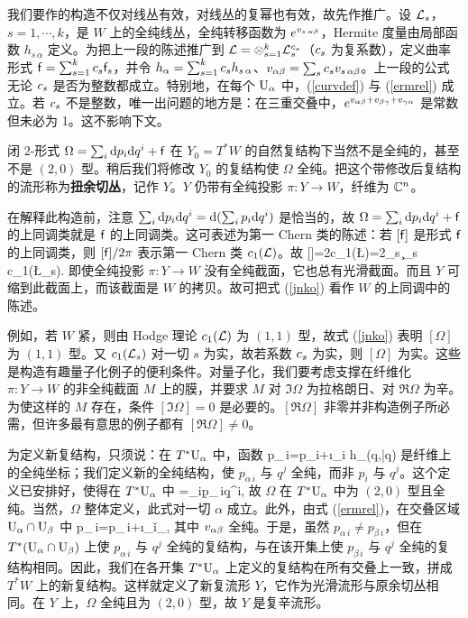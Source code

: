 我们要作的构造不仅对线丛有效，对线丛的复幂也有效，故先作推广。设 ${\mathcal L}_s$，$s=1,\cdots,k$，是 $W$ 上的全纯线丛，全纯转移函数为 $e^{v_{s\,\alpha\beta}}$，Hermite 度量由局部函数 $h_{s\,\alpha}$ 定义。为把上一段的陈述推广到 ${\mathcal L}=\otimes_{s=1}^k{\mathcal L}_s^{c_s}$（$c_s$ 为复系数），定义曲率形式 ${\sf f}=\sum_{s=1}^kc_s{\sf f}_s$，并令 $h_\alpha=\sum_{s=1}^kc_s h_{s\,\alpha}$、$v_{\alpha\beta}=\sum_sc_sv_{s\,\alpha\beta}$。上一段的公式无论 $c_s$ 是否为整数都成立。特别地，在每个 ${\mathrm U}_\alpha$ 中，(\ref{curvdef}) 与 (\ref{ermrel}) 成立。若 $c_s$ 不是整数，唯一出问题的地方是：在三重交叠中，$e^{v_{\alpha\beta}+v_{\beta\gamma}+v_{\gamma\alpha}}$ 是常数但未必为 1。这不影响下文。

闭 2-形式 $\Omega=\sum_i{\mathrm d} p_i{\mathrm d} q^i+{\sf f}$ 在 $Y_0=T^*W$ 的自然复结构下当然不是全纯的，甚至不是 $(2,0)$ 型。稍后我们将修改 $Y_0$ 的复结构使 $\Omega$ 全纯。把这个带修改后复结构的流形称为\textbf{扭余切丛}，记作 $Y$。$Y$ 仍带有全纯投影 $\pi:Y\to W$，纤维为 ${\mathbb C}^n$。

在解释此构造前，注意 $\sum_i{\mathrm d} p_i{\mathrm d} q^i={\mathrm d}(\sum_i p_i{\mathrm d} q^i)$ 是恰当的，故 $\Omega=\sum_i{\mathrm d} p_i{\mathrm d} q^i+{\sf f}$ 的上同调类就是 ${\sf f}$ 的上同调类。这可表述为第一 Chern 类的陈述：若 $[{\sf f}]$ 是形式 ${\sf f}$ 的上同调类，则 $[{\sf f}]/2\pi$ 表示第一 Chern 类 $c_1({\mathcal L})$。故
\be\label{jnko} [\Omega]=2\pi c_1(\L)=2\pi\sum_s \c_s c_1(\L_s). \ee
即使全纯投影 $\pi:Y\to W$ 没有全纯截面，它也总有光滑截面。而且 $Y$ 可缩到此截面上，而该截面是 $W$ 的拷贝。故可把式 (\ref{jnko}) 看作 $W$ 的上同调中的陈述。

例如，若 $W$ 紧，则由 Hodge 理论 $c_1({\mathcal L})$ 为 $(1,1)$ 型，故式 (\ref{jnko}) 表明 $[\Omega]$ 为 $(1,1)$ 型。又 $c_1({\mathcal L}_s)$ 对一切 $s$ 为实，故若系数 $c_s$ 为实，则 $[\Omega]$ 为实。这些是构造有趣量子化例子的便利条件。对量子化，我们要考虑支撑在纤维化 $\pi:Y\to W$ 的非全纯截面 $M$ 上的膜，并要求 $M$ 对 $\Im\Omega$ 为拉格朗日、对 $\Re\Omega$ 为辛。为使这样的 $M$ 存在，条件 $[\Im\Omega]=0$ 是必要的。$[\Re\Omega]$ 非零并非构造例子所必需，但许多最有意思的例子都有 $[\Re\Omega]\ne0$。

为定义新复结构，只须说：在 $T^*{\mathrm U}_\alpha$ 中，函数
\be\label{newc} p_{\alpha\,i}=p_i+\i\partial_i h_\alpha(q,\bar q) \ee
是纤维上的全纯坐标；我们定义新的全纯结构，使 $p_{\alpha\,i}$ 与 $q^j$ 全纯，而非 $p_i$ 与 $q^j$。这个定义已安排好，使得在 $T^*{\mathrm U}_\alpha$ 中
\be\label{ewc} \Omega=\sum_i\d p_{\alpha\,i}\d q^i, \ee
故 $\Omega$ 在 $T^*{\mathrm U}_\alpha$ 中为 $(2,0)$ 型且全纯。当然，$\Omega$ 整体定义，此式对一切 $\alpha$ 成立。此外，由式 (\ref{ermrel})，在交叠区域 ${\mathrm U}_\alpha\cap{\mathrm U}_\beta$ 中
\be\label{newco} p_{\alpha\,i}=p_{\beta\,i}+\i\partial_i\v_{\alpha\beta},\ee
其中 $v_{\alpha\beta}$ 全纯。于是，虽然 $p_{\alpha\,i}\ne p_{\beta\,i}$，但在 $T^*({\mathrm U}_\alpha\cap{\mathrm U}_\beta)$ 上使 $p_{\alpha\,i}$ 与 $q^j$ 全纯的复结构，与在该开集上使 $p_{\beta\,i}$ 与 $q^j$ 全纯的复结构相同。因此，我们在各开集 $T^*{\mathrm U}_\alpha$ 上定义的复结构在所有交叠上一致，拼成 $T^*W$ 上的新复结构。这样就定义了新复流形 $Y$，它作为光滑流形与原余切丛相同。在 $Y$ 上，$\Omega$ 全纯且为 $(2,0)$ 型，故 $Y$ 是复辛流形。

